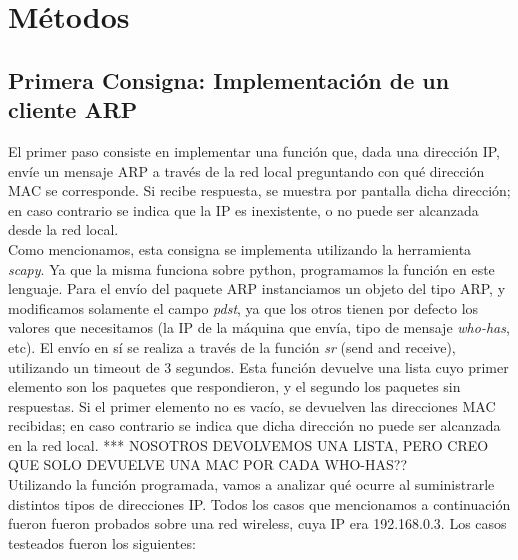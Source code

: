 \section{M\'etodos}


\subsection{Primera Consigna: Implementaci\'on de un cliente ARP}\label{sec:metodos_1}
El primer paso consiste en implementar una funci\'on que, dada una direcci\'on IP, env\'ie un mensaje ARP a trav\'es de la red local preguntando con qu\'e direcci\'on MAC se corresponde. Si recibe respuesta, se muestra por pantalla dicha direcci\'on; en caso contrario se indica que la IP es inexistente, o no puede ser alcanzada desde la red local.\\

Como mencionamos, esta consigna se implementa utilizando la herramienta \emph{scapy}. Ya que la misma funciona sobre python, programamos la funci\'on en este lenguaje. Para el env\'io del paquete ARP instanciamos un objeto del tipo ARP, y modificamos solamente el campo \emph{pdst}, ya que los otros tienen por defecto los valores que necesitamos (la IP de la m\'aquina que env\'ia, tipo de mensaje \emph{who-has}, etc). El env\'io en s\'i se realiza a trav\'es de la funci\'on \emph{sr} (send and receive), utilizando un timeout de 3 segundos. Esta funci\'on devuelve una lista cuyo primer elemento son los paquetes que respondieron, y el segundo los paquetes sin respuestas. Si el primer elemento no es vac\'io, se devuelven las direcciones MAC  recibidas; en caso contrario se indica que dicha direcci\'on no puede ser alcanzada en la red local. *** NOSOTROS DEVOLVEMOS UNA LISTA, PERO  CREO QUE SOLO DEVUELVE UNA MAC POR CADA WHO-HAS??\\

Utilizando la funci\'on programada, vamos a analizar qu\'e ocurre al suministrarle distintos tipos de direcciones IP. Todos los casos que mencionamos a continuaci\'on fueron fueron probados sobre una red wireless, cuya IP era 192.168.0.3. Los casos testeados fueron los siguientes:

